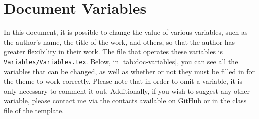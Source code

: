 \chapter{Document Variables}
\label{cp:variables}

In this document, it is possible to change the value of various variables, such as the author's name, the title of the work, and others, so that the author has greater flexibility in their work. The file that operates these variables is \verb|Variables/Variables.tex|. Below, in \autoref{tab:doc-variables}, you can see all the variables that can be changed, as well as whether or not they must be filled in for the theme to work correctly. Please note that in order to omit a variable, it is only necessary to comment it out. Additionally, if you wish to suggest any other variable, please contact me via the contacts available on GitHub or in the class file of the template.

